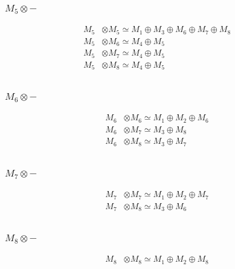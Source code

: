 \subsubsection{$ M_{5}\otimes -$}
\begin{align*}
M_{5} &\otimes M_{5} \simeq M_{1} \oplus M_{3} \oplus M_{6} \oplus M_{7} \oplus M_{8} \\
M_{5} &\otimes M_{6} \simeq M_{4} \oplus M_{5} \\
M_{5} &\otimes M_{7} \simeq M_{4} \oplus M_{5} \\
M_{5} &\otimes M_{8} \simeq M_{4} \oplus M_{5} \\
\end{align*}

\subsubsection{$ M_{6}\otimes -$}
\begin{align*}
M_{6} &\otimes M_{6} \simeq M_{1} \oplus M_{2} \oplus M_{6} \\
M_{6} &\otimes M_{7} \simeq M_{3} \oplus M_{8} \\
M_{6} &\otimes M_{8} \simeq M_{3} \oplus M_{7} \\
\end{align*}

\subsubsection{$ M_{7}\otimes -$}
\begin{align*}
M_{7} &\otimes M_{7} \simeq M_{1} \oplus M_{2} \oplus M_{7} \\
M_{7} &\otimes M_{8} \simeq M_{3} \oplus M_{6} \\
\end{align*}

\subsubsection{$ M_{8}\otimes -$}
\begin{align*}
M_{8} &\otimes M_{8} \simeq M_{1} \oplus M_{2} \oplus M_{8} \\
\end{align*}

